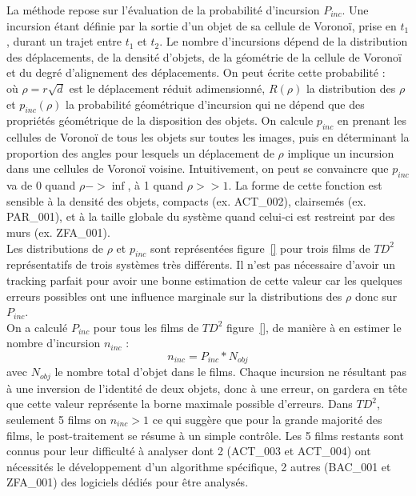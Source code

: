 	La méthode repose sur l'évaluation de la probabilité d'incursion $P_{inc}$. Une incursion étant définie par la sortie d'un objet de sa cellule de Voronoï, prise en $t_1$, durant un trajet entre $t_1$ et $t_2$. Le nombre d'incursions dépend de la distribution des déplacements, de la densité d'objets, de la géométrie de la cellule de Voronoï et du degré d'alignement des déplacements. On peut écrite cette probabilité :
	$$$$
	où $\rho=r\sqrt{d}$ est le déplacement réduit adimensionné, $R(\rho)$ la distribution des $\rho$ et $p_{inc}(\rho)$ la probabilité géométrique d’incursion qui ne dépend que des propriétés géométrique de la disposition des objets. On calcule $p_{inc}$ en prenant les cellules de Voronoï de tous les objets sur toutes les images, puis en déterminant la proportion des angles pour lesquels un déplacement de $\rho$ implique un incursion dans une cellules de Voronoï voisine. Intuitivement, on peut se convaincre que $p_{inc}$ va de 0 quand $\rho->\inf$, à 1 quand $\rho>>1$. La forme de cette fonction est sensible à la densité des objets, compacts (ex. ACT\_002), clairsemés (ex. PAR\_001), et à la taille globale du système quand celui-ci est restreint par des murs (ex. ZFA\_001).\\
	
	Les distributions de $\rho$ et $p_{inc}$ sont représentées figure~\ref{} pour trois films de $TD^2$ représentatifs de trois systèmes très différents. Il n'est pas nécessaire d'avoir un tracking parfait pour avoir une bonne estimation de cette valeur car les quelques erreurs possibles ont une influence marginale sur la distributions des $\rho$ donc sur $P_{inc}$.\\
	On a calculé $P_{inc}$ pour tous les films de $TD^2$ figure~\ref{}, de manière à en estimer le nombre d'incursion $n_{inc}$ :
	$$
	    n_{inc}=P_{inc}*N_{obj}
	$$
	avec $N_{obj}$ le nombre total d'objet dans le films.
	Chaque incursion ne résultant pas à une inversion de l'identité de deux objets, donc à une erreur, on gardera en tête que cette valeur représente la borne maximale possible d'erreurs. Dans $TD^2$, seulement 5 films on $n_{inc}>1$ ce qui suggère que pour la grande majorité des films, le post-traitement se résume à un simple contrôle. Les 5 films restants sont connus pour leur difficulté à analyser dont 2 (ACT\_003 et ACT\_004) ont nécessités le développement d'un algorithme spécifique, 2 autres (BAC\_001 et ZFA\_001) des logiciels dédiés pour être analysés.
	

